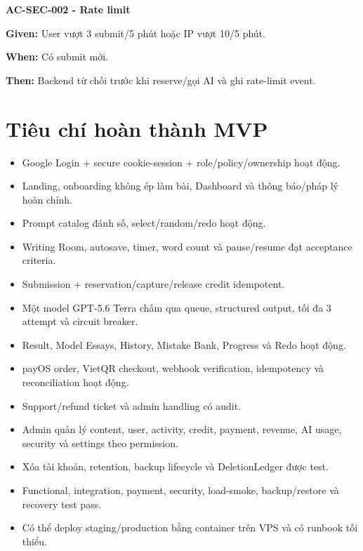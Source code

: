 \documentclass[11pt,a4paper]{article}
\begin{document}
\begin{acceptancebox}
\textbf{AC-SEC-002 - Rate limit}\par
\textbf{Given:} User vượt 3 submit/\allowbreak{}5 phút hoặc IP vượt 10/\allowbreak{}5 phút.\par
\textbf{When:} Có submit mới.\par
\textbf{Then:} Backend từ chối trước khi reserve/\allowbreak{}gọi AI và ghi rate-limit event.
\end{acceptancebox}
\section{Tiêu chí hoàn thành MVP}
\begin{itemize}
  \item Google Login + secure cookie-session + role/\allowbreak{}policy/\allowbreak{}ownership hoạt động.
  \item Landing, onboarding không ép làm bài, Dashboard và thông báo/\allowbreak{}pháp lý hoàn chỉnh.
  \item Prompt catalog đánh số, select/\allowbreak{}random/\allowbreak{}redo hoạt động.
  \item Writing Room, autosave, timer, word count và pause/\allowbreak{}resume đạt acceptance criteria.
  \item Submission + reservation/\allowbreak{}capture/\allowbreak{}release credit idempotent.
  \item Một model GPT-5.6 Terra chấm qua queue, structured output, tối đa 3 attempt và circuit breaker.
  \item Result, Model Essays, History, Mistake Bank, Progress và Redo hoạt động.
  \item payOS order, VietQR checkout, webhook verification, idempotency và reconciliation hoạt động.
  \item Support/\allowbreak{}refund ticket và admin handling có audit.
  \item Admin quản lý content, user, activity, credit, payment, revenue, AI usage, security và settings theo permission.
  \item Xóa tài khoản, retention, backup lifecycle và DeletionLedger được test.
  \item Functional, integration, payment, security, load-smoke, backup/\allowbreak{}restore và recovery test pass.
  \item Có thể deploy staging/\allowbreak{}production bằng container trên VPS và có runbook tối thiểu.
\end{itemize}
\end{document}

